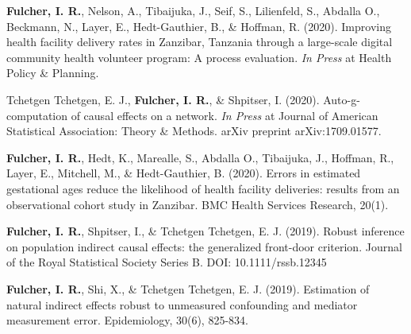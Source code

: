 \documentclass[12pt]{article}
\begin{document}
\begin{etaremune}
	
	
		
	
	
	\item \textbf{Fulcher, I. R.}, Nelson, A., Tibaijuka, J., Seif, S., Lilienfeld, S., Abdalla O., Beckmann, N., Layer, E., Hedt-Gauthier, B., \& Hoffman, R. (2020). Improving health facility delivery rates in Zanzibar, Tanzania through a large-scale digital community health volunteer program: A process evaluation. \textit{In Press} at Health Policy \& Planning. 
	
	\item Tchetgen Tchetgen, E. J., \textbf{Fulcher, I. R.}, \& Shpitser, I. (2020). Auto-g-computation of causal effects on a network. \textit{In Press} at Journal of American Statistical Association: Theory \& Methods. arXiv preprint arXiv:1709.01577. 
	
	\item \textbf{Fulcher, I. R.}, Hedt, K., Marealle, S., Abdalla O., Tibaijuka, J., Hoffman, R., Layer, E., Mitchell, M., \& Hedt-Gauthier, B. (2020). Errors in estimated gestational ages reduce the likelihood of health facility deliveries: results from an observational cohort study in Zanzibar. BMC Health Services Research, 20(1).
	
	\item \textbf{Fulcher, I. R.}, Shpitser, I., \& Tchetgen Tchetgen, E. J. (2019). Robust inference on population indirect causal effects: the generalized front-door criterion. Journal of the Royal Statistical Society Series B. DOI: 10.1111/rssb.12345
	
	\item \textbf{Fulcher, I. R.}, Shi, X., \& Tchetgen Tchetgen, E. J. (2019). Estimation of natural indirect effects robust to unmeasured confounding and mediator measurement error. Epidemiology, 30(6), 825-834.
	

\end{etaremune}
\end{document}
